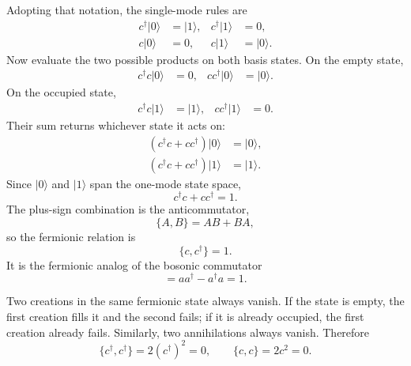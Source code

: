 Adopting that notation, the single-mode rules are
\begin{align}
c^\dagger|0\rangle&=|1\rangle,
&c^\dagger|1\rangle&=0,
\\
c|0\rangle&=0,
&c|1\rangle&=|0\rangle.
\end{align}
Now evaluate the two possible products on both basis states. On the empty state,
\begin{align}
c^\dagger c|0\rangle&=0,
&
cc^\dagger|0\rangle&=|0\rangle.
\end{align}
On the occupied state,
\begin{align}
c^\dagger c|1\rangle&=|1\rangle,
&
cc^\dagger|1\rangle&=0.
\end{align}
Their sum returns whichever state it acts on:
\begin{align}
(c^\dagger c+cc^\dagger)|0\rangle&=|0\rangle,
\\
(c^\dagger c+cc^\dagger)|1\rangle&=|1\rangle.
\end{align}
Since \(|0\rangle\) and \(|1\rangle\) span the one-mode state space,
\begin{equation}
c^\dagger c+cc^\dagger=1.
\end{equation}
The plus-sign combination is the anticommutator,
\begin{equation}
\{A,B\}=AB+BA,
\end{equation}
so the fermionic relation is
\begin{equation}
\{c,c^\dagger\}=1.
\end{equation}
It is the fermionic analog of the bosonic commutator
\begin{equation}
[a,a^\dagger]=aa^\dagger-a^\dagger a=1.
\end{equation}

Two creations in the same fermionic state always vanish. If the state is empty, the first creation fills it and the second fails; if it is already occupied, the first creation already fails. Similarly, two annihilations always vanish. Therefore
\begin{equation}
\{c^\dagger,c^\dagger\}=2(c^\dagger)^2=0,
\qquad
\{c,c\}=2c^2=0.
\end{equation}

\begin{classroomqa}
\end{classroomqa}

